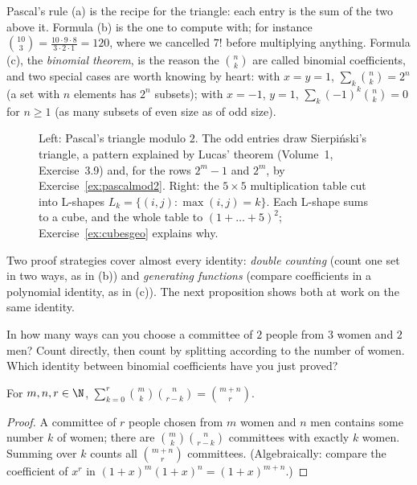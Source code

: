 Pascal's rule (a) is the recipe for the triangle: each entry is the sum of the two above it. Formula (b) is the one to compute with; for instance
$\binom{10}3=\frac{10\cdot9\cdot8}{3\cdot2\cdot1}=120$, where we cancelled $7!$ before multiplying anything. Formula (c), the \emph{binomial theorem},
is the reason the $\binom nk$ are called binomial coefficients, and two special cases are worth knowing by heart: with $x=y=1$,
$\sum_k\binom nk=2^n$ (a set with $n$ elements has $2^n$ subsets); with $x=-1$, $y=1$, $\sum_k(-1)^k\binom nk=0$ for $n\ge1$ (as many subsets of
even size as of odd size).

\begin{figure}[ht]
\centering
{}
\caption{Left: Pascal's triangle modulo $2$. The odd entries draw Sierpi\'nski's triangle, a pattern explained by Lucas' theorem (Volume~1, Exercise~3.9) and, for the rows $2^m-1$ and $2^m$, by Exercise~\ref{ex:pascalmod2}. Right: the $5\times5$ multiplication table cut into L-shapes $L_k=\{(i,j):\max(i,j)=k\}$. Each L-shape sums to a cube, and the whole table to $(1+\dots+5)^2$; Exercise~\ref{ex:cubesgeo} explains why.}
\label{fig:pascal}
\end{figure}

Two proof strategies cover almost every identity: \emph{double counting} (count one set in two ways, as in (b))
and \emph{generating functions} (compare coefficients in a polynomial identity, as in (c)). The next proposition shows both at work on the same identity.

\begin{think}
In how many ways can you choose a committee of $2$ people from $3$ women and $2$ men? Count directly, then count by splitting according to the number of women. Which identity between binomial coefficients have you just proved?
\end{think}

\begin{proposition}[Vandermonde]\label{prop:vandermonde}
For $m,n,r\in\N$, $\displaystyle\sum_{k=0}^{r}\binom mk\binom n{r-k}=\binom{m+n}r$.
\end{proposition}
\begin{proof}
A committee of $r$ people chosen from $m$ women and $n$ men contains some number $k$ of women;
there are $\binom mk\binom n{r-k}$ committees with exactly $k$ women. Summing over $k$ counts all
$\binom{m+n}r$ committees. (Algebraically: compare the coefficient of $x^r$ in $(1+x)^m(1+x)^n=(1+x)^{m+n}$.)
\end{proof}

